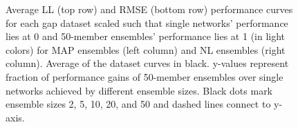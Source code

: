 \documentclass[../thesis.tex]{subfiles}
\begin{document}
\begin{figure}
    \centering
    \begin{subfigure}{0.49\textwidth}
        \setlength{\figwidth}{.99\textwidth}
        \setlength{\figheight}{.33\textheight}
        
        \label{fig:uci-gap-ensemble-sizes-ll-map}
    \end{subfigure}
    \begin{subfigure}{0.49\textwidth}
        \setlength{\figwidth}{.99\textwidth}
        \setlength{\figheight}{.33\textheight}
        
        \label{fig:uci-gap-ensemble-sizes-ll-llb}
    \end{subfigure}
    \begin{subfigure}{0.49\textwidth}
        \setlength{\figwidth}{.99\textwidth}
        \setlength{\figheight}{.33\textheight}
        
        \label{fig:uci-gap-ensemble-sizes-rmse-map}
    \end{subfigure}
    \begin{subfigure}{0.49\textwidth}
        \setlength{\figwidth}{.99\textwidth}
        \setlength{\figheight}{.33\textheight}
        
        \label{fig:uci-gap-ensemble-sizes-rmse-llb}
    \end{subfigure}
    \caption{Average LL (top row) and RMSE (bottom row) performance curves for each gap dataset scaled such that single networks' performance lies at 0 and 50-member ensembles' performance lies at 1 (in light colors) for MAP ensembles (left column) and NL ensembles (right column). Average of the dataset curves in black. y-values represent fraction of performance gains of 50-member ensembles over single networks achieved by different ensemble sizes. Black dots mark ensemble sizes 2, 5, 10, 20, and 50 and dashed lines connect to y-axis.}
    \label{fig:uci-gap-ensemble-sizes}
\end{figure}
\end{document}

